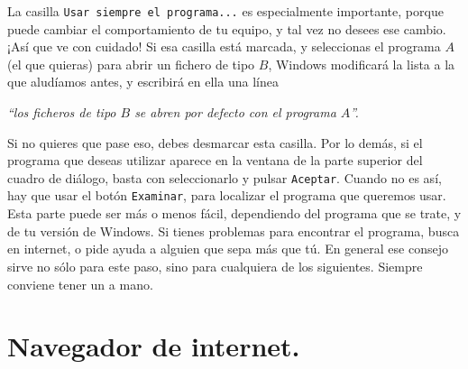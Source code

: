 \documentclass[10pt,a4paper]{article}
\newcounter {cont01}
\begin{document}
La casilla {\tt Usar siempre el programa...} es especialmente importante, porque puede cambiar el
comportamiento de tu equipo, y tal vez no desees ese cambio. ¡Así que ve con cuidado! Si esa
casilla está marcada, y seleccionas el programa $A$ (el que quieras) para abrir un fichero de tipo
$B$, Windows modificará la lista a la que aludíamos antes, y escribirá en ella una línea
\begin{center}
{\em ``los ficheros de tipo $B$ se abren por defecto con el programa $A$''.}
\end{center}
Si no quieres que pase eso, debes desmarcar esta casilla. Por lo demás, si el programa que deseas
utilizar aparece en la ventana de la parte superior del cuadro de diálogo, basta con seleccionarlo
y pulsar {\tt Aceptar}. Cuando no es así, hay que usar el botón {\tt Examinar}, para localizar el
programa que queremos usar. Esta parte puede ser más o menos fácil, dependiendo del programa que se
trate, y de tu versión de Windows. Si tienes problemas para encontrar el programa, busca en
internet, o pide ayuda a alguien que sepa más que tú. En general ese consejo sirve no sólo para
este paso, sino para cualquiera de los siguientes. Siempre conviene tener un  a mano.

\section{Navegador de internet.}
\label{tut00:sec:NavegadorInternet}
\end{document}
